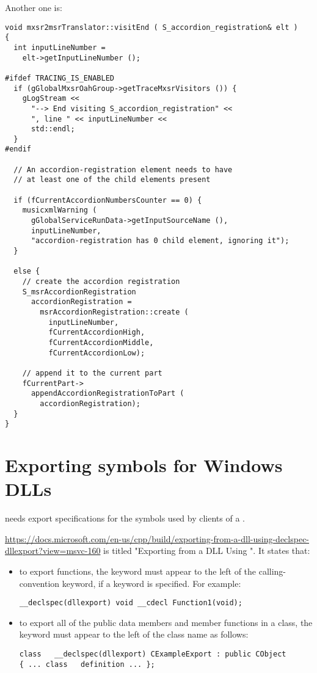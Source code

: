 Another one is:
\begin{lstlisting}[language=CPlusPlus]
void mxsr2msrTranslator::visitEnd ( S_accordion_registration& elt )
{
  int inputLineNumber =
    elt->getInputLineNumber ();

#ifdef TRACING_IS_ENABLED
  if (gGlobalMxsrOahGroup->getTraceMxsrVisitors ()) {
    gLogStream <<
      "--> End visiting S_accordion_registration" <<
      ", line " << inputLineNumber <<
      std::endl;
  }
#endif

  // An accordion-registration element needs to have
  // at least one of the child elements present

  if (fCurrentAccordionNumbersCounter == 0) {
    musicxmlWarning (
      gGlobalServiceRunData->getInputSourceName (),
      inputLineNumber,
      "accordion-registration has 0 child element, ignoring it");
  }

  else {
    // create the accordion registration
    S_msrAccordionRegistration
      accordionRegistration =
        msrAccordionRegistration::create (
          inputLineNumber,
          fCurrentAccordionHigh,
          fCurrentAccordionMiddle,
          fCurrentAccordionLow);

    // append it to the current part
    fCurrentPart->
      appendAccordionRegistrationToPart (
        accordionRegistration);
  }
}
\end{lstlisting}


\section{Exporting symbols for Windows DLLs}

 needs export specifications for the symbols used by clients of a .

\url{https://docs.microsoft.com/en-us/cpp/build/exporting-from-a-dll-using-declspec-dllexport?view=msvc-160} is titled "Exporting from a DLL Using ". It states that:
\begin{itemize}
\item to export functions, the  keyword must appear to the left of the calling-convention keyword, if a keyword is specified. For example:
\begin{lstlisting}[language=CPlusPlus]
__declspec(dllexport) void __cdecl Function1(void);
\end{lstlisting}

\item to export all of the public data members and member functions in a class, the keyword must appear to the left of the class   name as follows:
\begin{lstlisting}[language=CPlusPlus]
class   __declspec(dllexport) CExampleExport : public CObject
{ ... class   definition ... };
\end{lstlisting}

\end{itemize}

